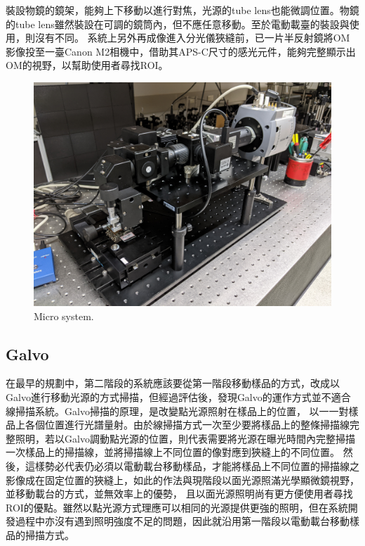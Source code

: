 \documentclass[12pt]{article}
\begin{document}
    裝設物鏡的鏡架，能夠上下移動以進行對焦，光源的tube lens也能微調位置。物鏡的tube lens雖然裝設在可調的鏡筒內，但不應任意移動。至於電動載臺的裝設與使用，則沒有不同。
    系統上另外再成像進入分光儀狹縫前，已一片半反射鏡將OM影像投至一臺Canon M2相機中，借助其APS-C尺寸的感光元件，能夠完整顯示出OM的視野，以幫助使用者尋找ROI。
    \begin{figure}
        \centering
        \includegraphics[width=\linewidth]{PXL_20210831_081957648.jpg}
        \caption{Micro system.}
    \end{figure}

    \subsection{Galvo}
    在最早的規劃中，第二階段的系統應該要從第一階段移動樣品的方式，改成以Galvo進行移動光源的方式掃描，但經過評估後，發現Galvo的運作方式並不適合線掃描系統。Galvo掃描的原理，是改變點光源照射在樣品上的位置，
    以一一對樣品上各個位置進行光譜量射。由於線掃描方式一次至少要將樣品上的整條掃描線完整照明，若以Galvo調動點光源的位置，則代表需要將光源在曝光時間內完整掃描一次樣品上的掃描線，並將掃描線上不同位置的像對應到狹縫上的不同位置。
    然後，這樣勢必代表仍必須以電動載台移動樣品，才能將樣品上不同位置的掃描線之影像成在固定位置的狹縫上，如此的作法與現階段以面光源照滿光學顯微鏡視野，並移動載台的方式，並無效率上的優勢，
    且以面光源照明尚有更方便使用者尋找ROI的優點。雖然以點光源方式理應可以相同的光源提供更強的照明，但在系統開發過程中亦沒有遇到照明強度不足的問題，因此就沿用第一階段以電動載台移動樣品的掃描方式。
\end{document}
